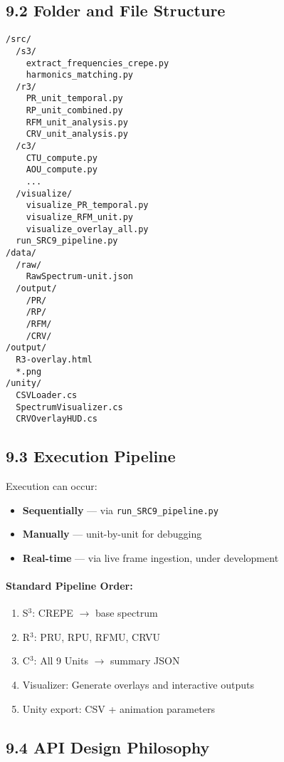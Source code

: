 \documentclass[10pt]{article}
\begin{document}
\subsection*{9.2 Folder and File Structure}

\begin{verbatim}
/src/
  /s3/
    extract_frequencies_crepe.py
    harmonics_matching.py
  /r3/
    PR_unit_temporal.py
    RP_unit_combined.py
    RFM_unit_analysis.py
    CRV_unit_analysis.py
  /c3/
    CTU_compute.py
    AOU_compute.py
    ...
  /visualize/
    visualize_PR_temporal.py
    visualize_RFM_unit.py
    visualize_overlay_all.py
  run_SRC9_pipeline.py
/data/
  /raw/
    RawSpectrum-unit.json
  /output/
    /PR/
    /RP/
    /RFM/
    /CRV/
/output/
  R3-overlay.html
  *.png
/unity/
  CSVLoader.cs
  SpectrumVisualizer.cs
  CRVOverlayHUD.cs
\end{verbatim}

\subsection*{9.3 Execution Pipeline}

Execution can occur:

\begin{itemize}
    \item \textbf{Sequentially} — via \texttt{run_SRC9_pipeline.py}
    \item \textbf{Manually} — unit-by-unit for debugging
    \item \textbf{Real-time} — via live frame ingestion, under development
\end{itemize}

\paragraph{Standard Pipeline Order:}

\begin{enumerate}
    \item S$^3$: CREPE $\rightarrow$ base spectrum
    \item R$^3$: PRU, RPU, RFMU, CRVU
    \item C$^3$: All 9 Units $\rightarrow$ summary JSON
    \item Visualizer: Generate overlays and interactive outputs
    \item Unity export: CSV + animation parameters
\end{enumerate}

\subsection*{9.4 API Design Philosophy}
\end{document}
